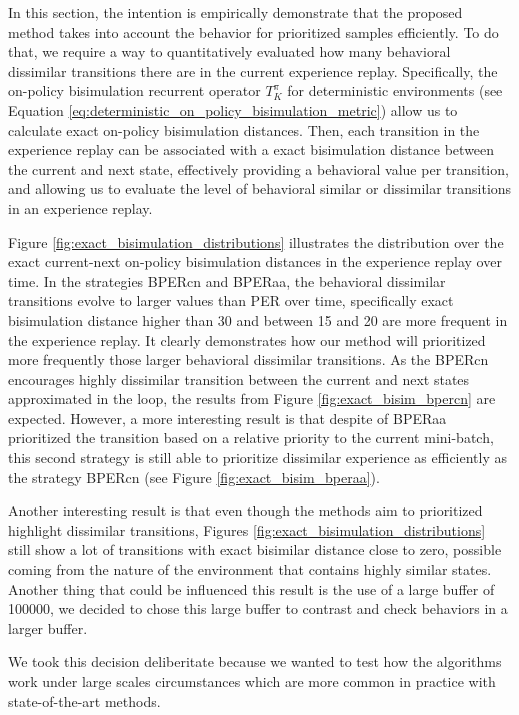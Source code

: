 In this section, the intention is empirically demonstrate that the proposed method takes into account the behavior for prioritized samples efficiently. To do that, we require a way to quantitatively evaluated how many behavioral dissimilar transitions there are in the current experience replay. Specifically, the on-policy bisimulation recurrent operator $T_K^\pi$ for deterministic environments (see Equation \ref{eq:deterministic_on_policy_bisimulation_metric}) allow us to calculate exact on-policy bisimulation distances. Then, each transition in the experience replay can be associated with a exact bisimulation distance between the current and next state, effectively providing a behavioral value per transition, and allowing us to evaluate the level of behavioral similar or dissimilar transitions in an experience replay. 

Figure \ref{fig:exact_bisimulation_distributions} illustrates the distribution over the exact current-next on-policy bisimulation distances in the experience replay over time. In the strategies BPERcn and BPERaa, the behavioral dissimilar transitions evolve to larger values than PER over time, specifically exact bisimulation distance higher than 30 and between 15 and 20 are more frequent in the experience replay. It clearly demonstrates how our method will prioritized more frequently those larger behavioral dissimilar transitions. As the BPERcn encourages highly dissimilar transition between the current and next states approximated in the loop, the results from Figure \ref{fig:exact_bisim_bpercn} are expected. However, a more interesting result is that despite of BPERaa prioritized the transition based on a relative priority to the current mini-batch, this second strategy is still able to prioritize dissimilar experience as efficiently as the strategy BPERcn (see Figure \ref{fig:exact_bisim_bperaa}).

Another interesting result is that even though the methods aim to prioritized highlight dissimilar transitions, Figures \ref{fig:exact_bisimulation_distributions} still show a lot of transitions with exact bisimilar distance close to zero, possible coming from the nature of the environment that contains highly similar states. Another thing that could be influenced this result is the use of a large buffer of 100000, we decided to chose this large buffer to contrast and check behaviors in a larger buffer.

We took this decision deliberitate because we wanted to test how the algorithms work under large scales circumstances which are more common in practice with state-of-the-art methods.

